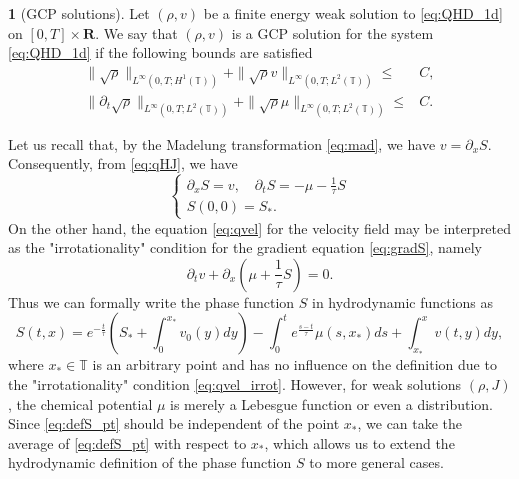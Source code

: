 \documentclass[leqno]{amsart}
\theoremstyle{plain}
\theoremstyle{definition}
\newtheorem{defn}[thm]{\protect\definitionname}
\theoremstyle{remark}
\theoremstyle{plain}
\theoremstyle{plain}
\providecommand{\definitionname}{Definition}
\def\R{{\mathbf R}}%
\def\T{{\mathbb T}}%
\def\d{{\partial}}
\DeclareMathOperator{\RE}{Re}
\DeclareMathOperator{\IM}{Im}
\numberwithin{equation}{section}
\begin{document}
\begin{defn}[GCP solutions]\label{def:GCPsln}
Let $(\rho, v)$ be a finite energy weak solution to \eqref{eq:QHD_1d} on 
$[0,T]\times\R$. We say that $(\rho, v)$ is a GCP solution for the system \eqref{eq:QHD_1d} if the following bounds are satisfied
\begin{equation*}
\begin{aligned}
\|\sqrt{\rho}\|_{L^\infty(0, T; H^1(\T))}+\|\sqrt\rho v\|_{L^\infty(0, T; L^2(\T))}\leq& C,\\
\|\d_t\sqrt{\rho}\|_{L^\infty(0, T; L^2(\T))}+\|\sqrt\rho\mu\|_{L^\infty(0, T; L^2(\T))}\leq& C.
\end{aligned}
\end{equation*}
\end{defn}

Let us recall that, by the Madelung transformation \eqref{eq:mad}, we have $v=\d_xS$. Consequently, from \eqref{eq:qHJ}, we have
\begin{equation}\label{eq:gradS}
\begin{cases}
\d_xS =v,\quad\d_t S=-\mu-\frac{1}{\tau}S \\
S(0,0)=S_*.
\end{cases}
\end{equation}
On the other hand, the equation \eqref{eq:qvel} for the velocity field may be interpreted as the "irrotationality" condition for the gradient equation \eqref{eq:gradS}, namely
\begin{equation}\label{eq:qvel_irrot}
\d_tv+\d_x(\mu+\frac1\tau S)=0.
\end{equation}
Thus we can formally write the phase function $S$ in hydrodynamic functions as
\begin{equation}\label{eq:defS_pt}
S(t,x)=e^{-\frac{t}{\tau}} \left(S_*+\int_0^{x_*}v_0(y)dy\right)-\int_0^t e^{\frac{s-t}{\tau}}\mu(s,x_*)ds+\int_{x_*}^x v(t,y)dy,
\end{equation}
where $x_*\in \T$ is an arbitrary point and has no influence on the definition due to the "irrotationality" condition \eqref{eq:qvel_irrot}. However, for weak solutions $(\rho,J)$, the chemical potential $\mu$ is merely a Lebesgue function or even a distribution. Since \eqref{eq:defS_pt} should be independent of the point $x_*$, we can take the average of \eqref{eq:defS_pt} with respect to $x_*$, which allows us to extend the hydrodynamic definition of the phase function $S$ to more general cases.
\end{document}
